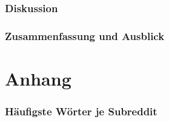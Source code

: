 \documentclass[11pt,a4paper,twoside]{article}
\begin{document}
\cleardoublepage

\hypertarget{diskussion}{%
\section{Diskussion}\label{diskussion}}

\cleardoublepage

\hypertarget{zusammenfassung-und-ausblick}{%
\section{Zusammenfassung und
Ausblick}\label{zusammenfassung-und-ausblick}}

\cleardoublepage

\hypertarget{part-anhang}{%
\part*{Anhang}\label{part-anhang}}


\hypertarget{appendix-anhang}{%
\appendix}


\hypertarget{haufigste-worter-je-subreddit}{%
\section{Häufigste Wörter je
Subreddit}\label{haufigste-worter-je-subreddit}}
\end{document}
